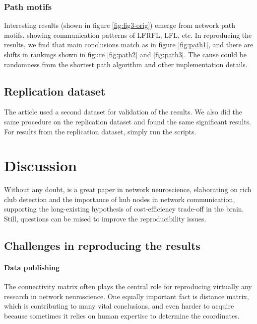 \documentclass{article}
\begin{document}
\subsubsection*{Path motifs}
Interesting results (shown in figure \ref{fig:fig3-orig}) emerge from network path motifs, showing communication patterns of LFRFL, LFL, etc. In reproducing the results, we find that main conclusions match as in figure \ref{fig:path1}, and there are shifts in rankings shown in figure \ref{fig:path2} and \ref{fig:path3}. The cause could be randomness from the shortest path algorithm and other implementation details.

\subsection*{Replication dataset}
The article used a second dataset for validation of the results. We also did the same procedure on the replication dataset and found the same significant results. For results from the replication dataset, simply run the scripts.

\section*{Discussion}
Without any doubt, \cite{heuvel_high-cost_2012} is a great paper in network neuroscience, elaborating on rich club detection and the importance of hub nodes in network communication, supporting the long-existing hypothesis of cost-efficiency trade-off in the brain. Still, questions can be raised to improve the reproducibility issues. 

\subsection*{Challenges in reproducing the results}

\paragraph{Data publishing} The connectivity matrix often plays the central role for reproducing virtually any research in network neuroscience. One equally important fact is distance matrix, which is contributing to many vital conclusions, and even harder to acquire because sometimes it relies on human expertise to determine the coordinates. 
\end{document}
